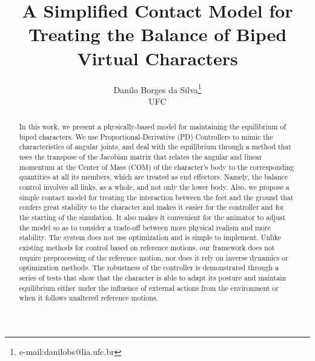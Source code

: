 \documentclass[tog]{acmsiggraph}
\title{A Simplified Contact Model for Treating the Balance of Biped Virtual Characters}
\author{Danilo Borges da Silva\thanks{e-mail:danilobs@lia.ufc.br}\\UFC}
\begin{document}


\maketitle

\begin{abstract}

In this work, we present a physically-based model for maintaining the equilibrium of biped characters. We use Proportional-Derivative (PD)
Controllers to mimic the characteristics of angular joints, and deal with the equilibrium through a method that uses the transpose of the 
Jacobian matrix that relates the angular and linear momentum at the Center of Mass (COM) of the character’s body to the corresponding quantities
at all its members, which are treated as end effectors.
Namely, the balance control involves all links, as a whole, and not only the lower body.
Also, we propose a simple contact model for treating the interaction between
the feet and the ground that confers great stability to the character and makes it easier for the controller and for the starting of the 
simulation. It also makes it convenient for the animator to adjust the model so as to consider a trade-off between more physical realism and 
more stability. The system does not use optimization and is simple to implement. Unlike existing methods for control based on reference motions, our framework 
does not require preprocessing of the reference motion, nor does it rely on inverse dynamics or optimization methods.
The robustness of the controller is demonstrated through a 
series of tests that show that the character is able to adapt its posture and maintain equilibrium either under the influence of external actions
from the environment or when it follows unaltered reference motions. 


\end{abstract}
\end{document}
